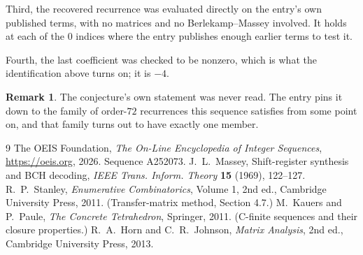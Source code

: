 \documentclass[11pt,a4paper]{article}
\theoremstyle{plain}
\theoremstyle{definition}
\newtheorem{remark}[theorem]{Remark}
\begin{document}
Third, the recovered recurrence was evaluated directly on the entry's own published terms, with
no matrices and no Berlekamp--Massey involved. It holds at each of the $0$ indices where
the entry publishes enough earlier terms to test it.

Fourth, the last coefficient was checked to be nonzero, which is what the identification above
turns on; it is $-4$.

\begin{remark}
The conjecture's own statement was never read. The entry pins it down to the family of
order-$72$ recurrences this sequence satisfies from some point on, and that family turns
out to have exactly one member.
\end{remark}

\begin{thebibliography}{9}
 The OEIS Foundation, \emph{The On-Line Encyclopedia of Integer
Sequences}, \url{https://oeis.org}, 2026. Sequence A252073.
 J.~L.~Massey, Shift-register synthesis and BCH decoding, \emph{IEEE
Trans. Inform. Theory} \textbf{15} (1969), 122--127.
 R.~P.~Stanley, \emph{Enumerative Combinatorics}, Volume 1, 2nd ed.,
Cambridge University Press, 2011. (Transfer-matrix method, Section 4.7.)
 M.~Kauers and P.~Paule, \emph{The Concrete Tetrahedron}, Springer, 2011.
(C-finite sequences and their closure properties.)
 R.~A.~Horn and C.~R.~Johnson, \emph{Matrix Analysis}, 2nd ed., Cambridge
University Press, 2013.
\end{thebibliography}
\end{document}
